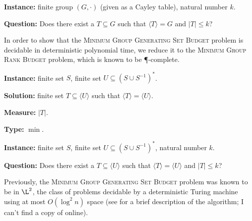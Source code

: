 \documentclass[]{article}
\newcommand{\gen}[1]{{\langle #1 \rangle}}
\begin{document}
\begin{definition}
  \mbox{}

  \textbf{Instance:} finite group $(G, \cdot)$ (given as a Cayley table), natural number $k$.

  \textbf{Question:} Does there exist a $T \subseteq G$ such that $\gen{T} = G$ and $|T| \leq k$?
\end{definition}

In order to show that the \textsc{Minimum Group Generating Set Budget} problem is decidable in deterministic polynomial time, we reduce it to the \textsc{Minimum Group Rank Budget} problem, which is known to be \P-complete.

\begin{definition}
  \mbox{}

  \textbf{Instance:} finite set $S$, finite set $U \subseteq (S \cup S^{-1})^*$.

  \textbf{Solution:} finite set $T \subseteq \gen{U}$ such that $\gen{T} = \gen{U}$.

  \textbf{Measure:} $|T|$.

  \textbf{Type:} $\min$.
\end{definition}

\begin{definition}
  \mbox{}

  \textbf{Instance:} finite set $S$, finite set $U \subseteq (S \cup S^{-1})^*$, natural number $k$.

  \textbf{Question:} Does there exist a $T \subseteq \gen{U}$ such that $\gen{T} = \gen{U}$ and $|T| \leq k$?
\end{definition}

Previously, the \textsc{Minimum Group Generating Set Budget} problem was known to be in $\L^2$, the class of problems decidable by a deterministic Turing machine using at most $O(\log^2 n)$ space \cite{lsz77} (see \cite[Proposition~3]{at06} for a brief description of the algorithm; I can't find a copy of \cite{lsz77} online).
\end{document}
